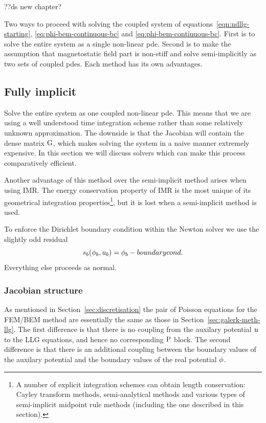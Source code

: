 ??ds new chapter?

Two ways to proceed with solving the coupled system of equations~\eqref{eqn:ndllg-starting}, \eqref{eq:phi-bem-continuous-bc} and \eqref{eq:phi-bem-continuous-bc}.
First is to solve the entire system as a single non-linear pde.
Second is to make the assumption that magnetostatic field part is non-stiff and solve semi-implicitly as two sets of coupled pdes.
Each method has its own advantages.

\subsection{Fully implicit}

Solve the entire system as one coupled non-linear pde.
This means that we are using a well understood time integration scheme rather than some relatively unknown approximation.
The downside is that the Jacobian will contain the dense matrix ${\mathbf{\mathrm{G}}}$, which makes solving the system in a naive manner extremely expensive.
In this section we will discuss solvers which can make this process comparatively efficient.

Another advantage of this method over the semi-implicit method arises when using IMR.
The energy conservation property of IMR is the most unique of its geometrical integration properties\footnote{A number of explicit integration schemes can obtain length conservation: Cayley transform methods\cite{Lewis2003}, semi-analytical methods\cite{Wiele2010} and various types of semi-implicit midpoint rule methods\cite{Spargo2003a}\cite{Mentink2010} (including the one described in this section).}, but it is lost when a semi-implicit method is used.

To enforce the Dirichlet boundary condition within the Newton solver we use the slightly odd residual
\newcommand{\rphimb}{\rphi_b}
\begin{equation}
  \rphimb(\phim_b, \phione_b) = \phim_b - boundary cond.
\end{equation}
Everything else proceeds as normal.


\subsubsection{Jacobian structure}
\label{sec:bem-jacobian-structure}

As mentioned in Section~\ref{sec:discretisation} the pair of Poisson equations for the FEM/BEM method are essentially the same as those in Section~\ref{sec:galerk-meth-llg}.
The first difference is that there is no coupling from the auxilary potential $u$ to the LLG equations, and hence no corresponding $\mathrm{P}$ block.
The second difference is that there is an additional coupling between the boundary values of the auxilary potential and the boundary values of the real potential $\phi$.

